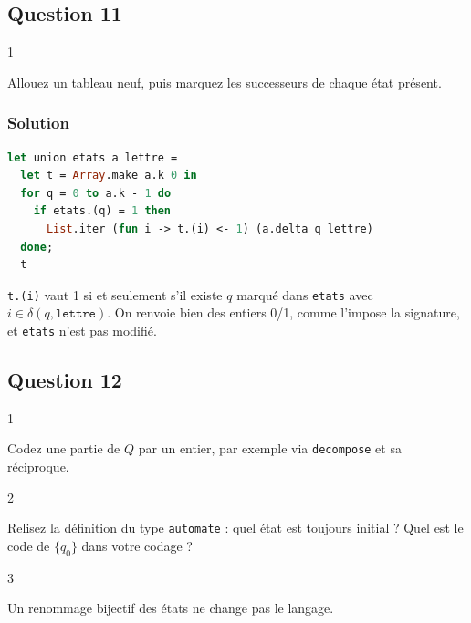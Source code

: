 \documentclass[11pt,a4paper]{article}
\begin{document}
\hypertarget{question-11}{%
\subsection{Question 11}\label{question-11}}

\begin{indication}{1}

Allouez un tableau neuf, puis marquez les successeurs de chaque état présent.

\end{indication}

\hypertarget{solution-10}{%
\subsubsection{Solution}\label{solution-10}}

\begin{lstlisting}[language=Caml]
let union etats a lettre =
  let t = Array.make a.k 0 in
  for q = 0 to a.k - 1 do
    if etats.(q) = 1 then
      List.iter (fun i -> t.(i) <- 1) (a.delta q lettre)
  done;
  t
\end{lstlisting}

\texttt{t.(i)} vaut 1 si et seulement s'il existe \(q\) marqué dans \texttt{etats} avec \(i\in\delta(q,\texttt{lettre})\). On renvoie bien des entiers 0/1, comme l'impose la signature, et \texttt{etats} n'est pas modifié.

\hypertarget{question-12}{%
\subsection{Question 12}\label{question-12}}

\begin{indication}{1}

Codez une partie de \(Q\) par un entier, par exemple via \texttt{decompose} et sa réciproque.

\end{indication}

\begin{indication}{2}

Relisez la définition du type \texttt{automate} : quel état est toujours initial ? Quel est le code de \(\{q_0\}\) dans votre codage ?

\end{indication}

\begin{indication}{3}

Un renommage bijectif des états ne change pas le langage.

\end{indication}
\end{document}
